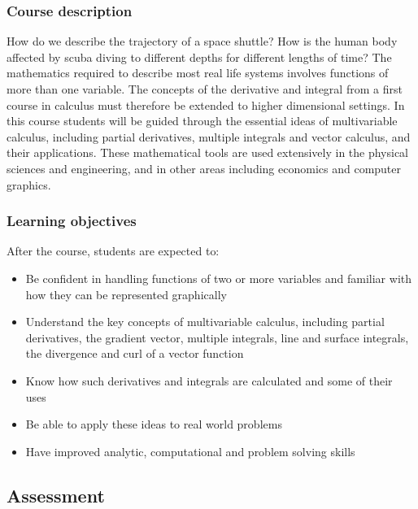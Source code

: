 \documentclass[
]{article}
\begin{document}
\hypertarget{course-description}{%
\subsubsection*{Course description}\label{course-description}}

How do we describe the trajectory of a space shuttle? How is the human body affected by
scuba diving to different depths for different lengths of time? The mathematics required to
describe most real life systems involves functions of more than one variable. The concepts
of the derivative and integral from a first course in calculus must therefore be extended to
higher dimensional settings. In this course students will be guided through the essential ideas
of multivariable calculus, including partial derivatives, multiple integrals and vector calculus,
and their applications. These mathematical tools are used extensively in the physical sciences
and engineering, and in other areas including economics and computer graphics.

\hypertarget{learning-objectives}{%
\subsubsection*{Learning objectives}\label{learning-objectives}}

After the course, students are expected to:

\begin{itemize}
\item
  Be confident in handling functions of two or more variables and familiar with how
  they can be represented graphically
\item
  Understand the key concepts of multivariable calculus, including partial derivatives,
  the gradient vector, multiple integrals, line and surface integrals, the divergence and
  curl of a vector function
\item
  Know how such derivatives and integrals are calculated and some of their uses
\item
  Be able to apply these ideas to real world problems
\item
  Have improved analytic, computational and problem solving skills
\end{itemize}

\hypertarget{assessment}{%
\subsection*{Assessment}\label{assessment}}
\end{document}
